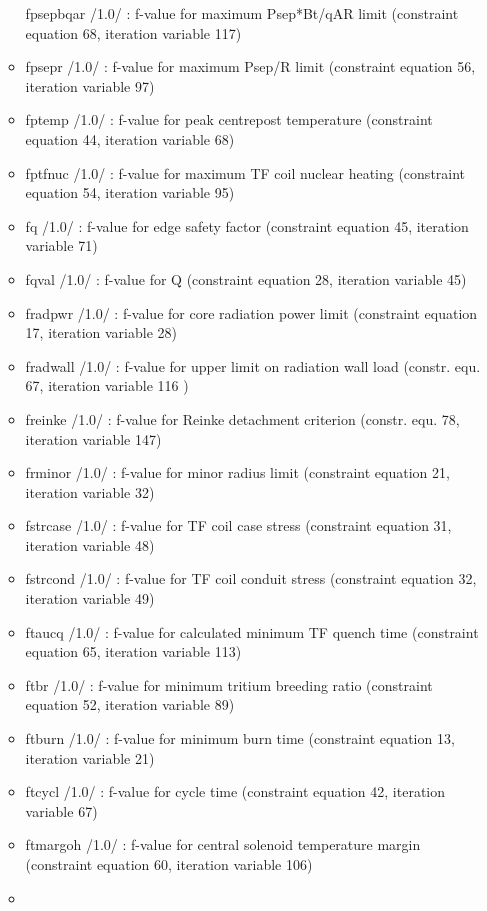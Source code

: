 \documentclass[]{article}
\begin{document}
\begin{itemize}
\begin{itemize}
    fpsepbqar /1.0/ : f-value for maximum Psep*Bt/qAR limit (constraint
    equation 68, iteration variable 117)
  \item
    fpsepr /1.0/ : f-value for maximum Psep/R limit (constraint equation
    56, iteration variable 97)
  \item
    fptemp /1.0/ : f-value for peak centrepost temperature (constraint
    equation 44, iteration variable 68)
  \item
    fptfnuc /1.0/ : f-value for maximum TF coil nuclear heating
    (constraint equation 54, iteration variable 95)
  \item
    fq /1.0/ : f-value for edge safety factor (constraint equation 45,
    iteration variable 71)
  \item
    fqval /1.0/ : f-value for Q (constraint equation 28, iteration
    variable 45)
  \item
    fradpwr /1.0/ : f-value for core radiation power limit (constraint
    equation 17, iteration variable 28)
  \item
    fradwall /1.0/ : f-value for upper limit on radiation wall load
    (constr. equ. 67, iteration variable 116 )
  \item
    freinke /1.0/ : f-value for Reinke detachment criterion (constr.
    equ. 78, iteration variable 147)
  \item
    frminor /1.0/ : f-value for minor radius limit (constraint equation
    21, iteration variable 32)
  \item
    fstrcase /1.0/ : f-value for TF coil case stress (constraint
    equation 31, iteration variable 48)
  \item
    fstrcond /1.0/ : f-value for TF coil conduit stress (constraint
    equation 32, iteration variable 49)
  \item
    ftaucq /1.0/ : f-value for calculated minimum TF quench time
    (constraint equation 65, iteration variable 113)
  \item
    ftbr /1.0/ : f-value for minimum tritium breeding ratio (constraint
    equation 52, iteration variable 89)
  \item
    ftburn /1.0/ : f-value for minimum burn time (constraint equation
    13, iteration variable 21)
  \item
    ftcycl /1.0/ : f-value for cycle time (constraint equation 42,
    iteration variable 67)
  \item
    ftmargoh /1.0/ : f-value for central solenoid temperature margin
    (constraint equation 60, iteration variable 106)
  \item

\end{itemize}
\end{itemize}
\end{document}
